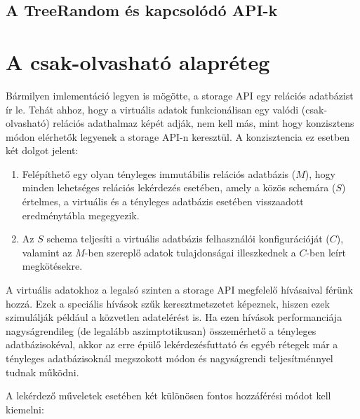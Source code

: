 \documentclass[
    parspace,
    noindent,
    nohyp,
]{elteiktdk}[2023/04/10]
\newcommand{\longcomment}[2]{\todo[inline]{Long comment: #1}}
\begin{document}

\longcomment{Storage API ötletelés}{
schemák, táblák és oszlopok
indexek
   normál
   rendezetlen (optimalizálás-egyszerűsítés, kezelhető normál indexek halmazaként is)
   full-text
   spatial???
}

\subsection{A TreeRandom és kapcsolódó API-k}


\section{A csak-olvasható alapréteg}

Bármilyen imlementáció legyen is mögötte, a storage API egy relációs adatbázist ír le.
Tehát ahhoz, hogy a virtuális adatok funkcionálisan egy valódi (csak-olvasható) relációs adathalmaz képét adják,
nem kell más, mint hogy konzisztens módon elérhetők legyenek a storage API-n keresztül.
A konzisztencia ez esetben két dolgot jelent:

\begin{enumerate}
  \item Felépíthető egy olyan tényleges immutábilis relációs adatbázis ($M$),
        hogy minden lehetséges relációs lekérdezés esetében, amely a közös schemára ($S$) értelmes,
        a virtuális és a tényleges adatbázis esetében visszaadott eredménytábla megegyezik.
  \item Az $S$ schema teljesíti a virtuális adatbázis felhasználói konfigurációját ($C$),
        valamint az $M$-ben szereplő adatok tulajdonságai illeszkednek a $C$-ben leírt megkötésekre.
\end{enumerate}

A virtuális adatokhoz a legalsó szinten a storage API megfelelő hívásaival férünk hozzá.
Ezek a speciális hívások szűk keresztmetszetet képeznek,
hiszen ezek szimulálják például a közvetlen adatelérést is.
Ha ezen hívások performanciája nagyságrendileg (de legalább aszimptotikusan) összemérhető a tényleges adatbázisokéval,
akkor az erre épülő lekérdezésfuttató és egyéb rétegek már
a tényleges adatbázisoknál megszokott módon és nagyságrendi teljesítménnyel tudnak működni.

A lekérdező műveletek esetében két különösen fontos hozzáférési módot kell kiemelni:
\end{document}

